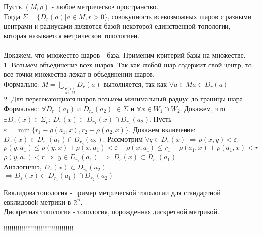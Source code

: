 \begin{definition}
Пусть $(M,\rho)$ - любое метрическое пространство.\\ Тогда $\Sigma=\{D_r(a)|a{\in}M,r>0\}$, совокупность всевозможных шаров с разными центрами и радиусами являются базой некоторой единственной топологии, которая называется метрической топологией.\\\\
Докажем, что множество шаров - база. Применим критерий базы на множестве.\\
1. Возьмем объединение всех шаров. Так как любой шар содержит свой центр, то все точки множества лежат в объединении шаров.\\ Формально: $M=\bigcup\limits_{\underset{a{\in}M}{r>0}}D_r(a)$ выполняется, так как $\forall a{\in}M a{\in}D_r(a)$ \\
2. Для пересекающихся шаров возьмем минимальный радиус до границы шара.\\
Формально: $\forall D_{r_1}(a_1)$ и $D_{r_2}(a_2)$ $\in\Sigma$ и $\forall x{\in}W_1{\cap}W_2$. Докажем, что $\exists D_{\varepsilon}(x){\in}\Sigma_{\rho}$: $D_{\varepsilon}(x){\subset}D_{r_1}(x){\cap}D_{r_2}(a_2)$. Пусть $\varepsilon=\min\{r_1-\rho(a_1,x),r_2-\rho(a_2,x)\}$. Докажем включение: $D_{\varepsilon}(x){\subset}D_{r_1}(a_1){\cap}D_{r_2}(a_2)$. Рассмотрим $\forall y{\in}D_{\varepsilon}(x)$ $\Rightarrow \rho(x,y)<\varepsilon$.\\
$\rho(y,a_1){\leq}\rho(y,x)+\rho(x,a_1)<\varepsilon+\rho(x,a_1){\leq}r_1-\rho(a_1,x)+\rho(a_1,x)<r$\\ $\rho(y,a_1)<r \Rightarrow$ $y{\in}D_{r_1}(a_1)$ $\Rightarrow$ $D_{\varepsilon}(x){\subset}D_{r_1}(a_1)$\\
Аналогично, $D_{\varepsilon}(x){\subset}D_{r_2}(a_2)$\\$\Rightarrow D_{\varepsilon}(x){\subset}D_{r_1}(a_1){\cap}D_{r_2}(a_2)$
\end{definition}

\begin{example}
Евклидова топология - пример метрической топологии для
стандартной евклидовой метрики в $\mathbb{R}^n$.\\Дискретная топология - топология, порожденная дискретной метрикой.\\
\end{example}

!!!!!!!!!!!!!!!!!!!!!!!!!!!!!!!!!!!!


